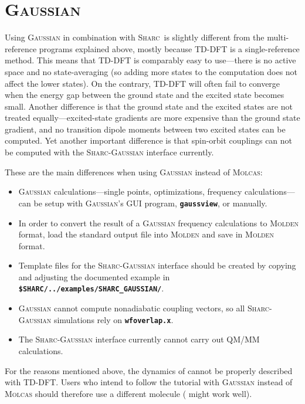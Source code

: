 \documentclass[a4paper,11pt,DIV=15,openany]{scrbook}
\makeatletter
\newcommand{\refermanual}[2][rectangle,draw=B,thick,fill=black!5,inner sep=1pt,outer sep=0pt,rounded corners]{\marginpar{\tikz[baseline=(current bounding box.north)]\node at (0,0) [#1]{\begin{tabular}{@{}l@{}}See\\ section\\ \ref*{#2}\\ (p. \pageref*{#2})\\ in the\\ manual.\end{tabular}};}}
\newcommand{\sharc}{\textsc{Sharc}}
\newcommand{\ttt}[1]{\textbf{\texttt{#1}}}
\makeatother
\begin{document}
\section{\textsc{Gaussian}}
\refermanual{m-sec:int:gaussian}

Using \textsc{Gaussian} in combination with \sharc\ is slightly different from the multi-reference programs explained above, mostly because TD-DFT is a single-reference method.
This means that TD-DFT is comparably easy to use---there is no active space and no state-averaging (so adding more states to the computation does not affect the lower states).
On the contrary, TD-DFT will often fail to converge when the energy gap between the ground state and the excited state becomes small.
Another difference is that the ground state and the excited states are not treated equally---excited-state gradients are more expensive than the ground state gradient, and no transition dipole moments between two excited states can be computed.
Yet another important difference is that spin-orbit couplings can not be computed with the \sharc-\textsc{Gaussian} interface currently.

These are the main differences when using \textsc{Gaussian} instead of \textsc{Molcas}:
\begin{itemize}
  \item \textsc{Gaussian} calculations---single points, optimizations, frequency calculations---can be setup with \textsc{Gaussian}'s GUI program, \ttt{gaussview}, or manually.
  \item In order to convert the result of a \textsc{Gaussian} frequency calculations to \textsc{Molden} format, load the standard output file into \textsc{Molden} and save in \textsc{Molden} format.
  \item Template files for the \sharc-\textsc{Gaussian} interface should be created by copying and adjusting the documented example in \ttt{\$SHARC/../examples/SHARC\_GAUSSIAN/}.
  \item \textsc{Gaussian} cannot compute nonadiabatic coupling vectors, so all \sharc-\textsc{Gaussian} simulations rely on \ttt{wfoverlap.x}.
  \item The \sharc-\textsc{Gaussian} interface currently cannot carry out QM/MM calculations.
\end{itemize}

For the reasons mentioned above, the dynamics of  cannot be properly described with TD-DFT.
Users who intend to follow the tutorial with \textsc{Gaussian} instead of \textsc{Molcas} should therefore use a different molecule ( might work well).
\end{document}
